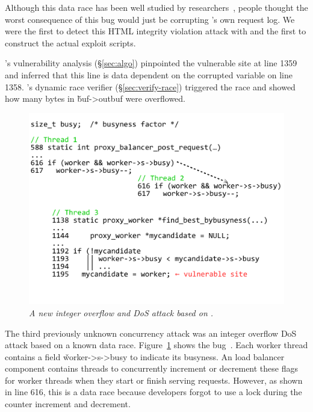 Although this data race has been well studied 
by researchers~\cite{lu:concurrency-bugs}, people thought the worst 
consequence of this bug would just be corrupting \apache's own request log. 
We were the first to detect this HTML integrity violation attack with \xxx 
and the first to construct the actual exploit scripts. 

\xxx's vulnerability analysis (\S\ref{sec:algo}) pinpointed the vulnerable site 
at line 1359 and inferred that this line is data dependent on the corrupted 
variable on line 1358. \xxx's dynamic race verifier (\S\ref{sec:verify-race}) 
triggered the race and showed how many bytes in
\v{buf->outbuf} were overflowed.

\begin{figure}[h]
	\centering
	\vspace{-.15in}
	\includegraphics[width=0.85\columnwidth]{figures/apache-46215}
	\vspace{-.4in}
	\caption{{\em A new integer overflow and DoS attack based on .}} 
	\label{fig:apache-46215}
	\vspace{-.1in}
\end{figure}

The third previously unknown concurrency attack was an integer overflow DoS 
attack based on a known  data race. Figure~\ref{fig:apache-46215} 
shows the  bug~\cite{apache-bug-46215}. Each \apache worker thread 
contains a field \v{worker->s->busy} to indicate its busyness. An \apache 
load balancer component contains threads to concurrently increment or decrement 
these flags for worker threads when they start or finish serving requests. 
However, as shown in line 616, this is a data race because developers forgot to 
use a lock during the counter increment and decrement.

